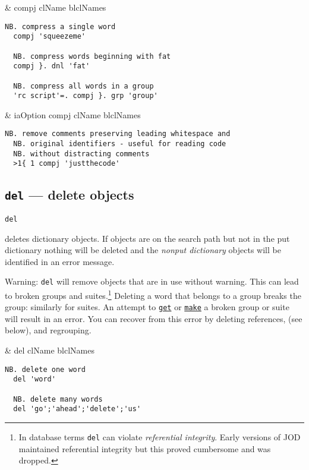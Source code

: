 \begin{wordhead}
\monad & compj clName \argsep blclNames \\
\end{wordhead}
\begin{lstlisting}[frame=single,framerule=0pt]
  NB. compress a single word
  compj 'squeezeme'  
  
  NB. compress words beginning with fat
  compj }. dnl 'fat' 

  NB. compress all words in a group 
  'rc script'=. compj }. grp 'group'
\end{lstlisting}

\begin{wordhead}
\dyad & iaOption compj clName \argsep blclNames \\
\end{wordhead}
\begin{lstlisting}[frame=single,framerule=0pt]
  NB. remove comments preserving leading whitespace and
  NB. original identifiers - useful for reading code
  NB. without distracting comments
  >1{ 1 compj 'justthecode'   
\end{lstlisting}

\subsection{\texttt{del} --- delete objects}

\hypertarget{il:del}{\texttt{del}} deletes dictionary objects. 
If objects are on the search path but not
 in the put dictionary nothing will be deleted and 
 the \emph{nonput dictionary} objects will be identified in an error message. 

Warning: \texttt{del} will remove objects that are in use without warning.
 This can lead to broken groups and suites.\footnote{In database
 terms \texttt{del} can violate \emph{referential integrity}. Early versions
 of JOD maintained referential integrity but this proved cumbersome and
 was dropped.} Deleting a word that belongs
 to a group breaks the group:  similarly for suites.
 An attempt to \hyperlink{il:get}{\texttt{get}} or \hyperlink{il:make}{\texttt{make}}
  a broken group or suite will result in an error.  You can recover from this
  error by deleting references, (see below), and regrouping.
  
\begin{wordhead}
\monad &  del clName \argsep blclNames \\
\end{wordhead}
\begin{lstlisting}[frame=single,framerule=0pt]
  NB. delete one word
  del 'word'  
  
  NB. delete many words                   
  del 'go';'ahead';'delete';'us' 
\end{lstlisting}

